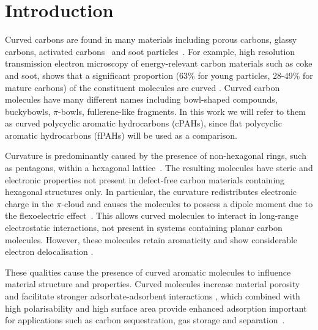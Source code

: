 %
\section{Introduction}
\label{sec:Introduction}

Curved carbons are found in many materials including porous carbons, glassy carbons, activated carbons~\cite{Harris2005new,Martin2019topology,Martin2019nanostructure} and soot particles~\cite{Martin2018flexo}. For example, high resolution transmission electron microscopy of energy-relevant carbon materials such as coke and soot, shows that a significant proportion (63\% for young particles, 28-49\% for mature carbons) of the constituent molecules are curved \cite{wang2017improved,zhong2018structural,Martin2018flexo}. 
Curved carbon molecules have many different names including bowl-shaped compounds, buckybowls, $\pi$-bowls, fullerene-like fragments. In this work we will refer to them as curved polycyclic aromatic hydrocarbons (cPAHs), since flat polycyclic aromatic hydrocarbons (fPAHs) will be used as a comparison.

Curvature is predominantly caused by the presence of non-hexagonal rings, such as pentagons, within a hexagonal lattice~\cite{Martin2018polar}. The resulting molecules have steric and electronic properties not present in defect-free carbon materials containing hexagonal structures only. In particular, the curvature redistributes electronic charge in the $\pi$-cloud and causes the molecules to possess a dipole moment due to the flexoelectric effect~\cite{Martin2017}. This allows curved molecules to interact in long-range electrostatic interactions, not present in systems containing planar carbon molecules. However, these molecules retain aromaticity and show considerable electron delocalisation \cite{grabowsky2010electron,Dobrowolski2011aromatic}.

These qualities cause the presence of curved aromatic molecules to influence material structure and properties. Curved molecules increase material porosity \cite{Harris2005new} and facilitate stronger adsorbate-adsorbent interactions \cite{Martin2017}, which combined with high polarisability and high surface area provide enhanced adsorption important for applications such as carbon sequestration, gas storage and separation~\cite{Scanlon2006investigation}.

